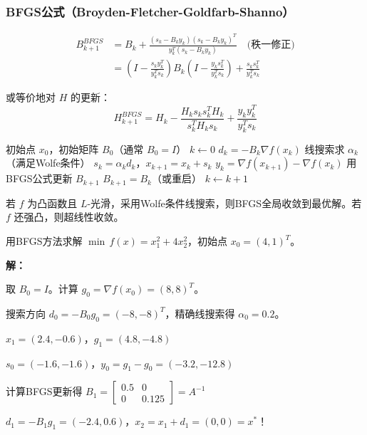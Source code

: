 \subsubsection{BFGS公式（Broyden-Fletcher-Goldfarb-Shanno）}

\begin{align}
B_{k+1}^{BFGS} &= B_k + \frac{(s_k - B_k y_k)(s_k - B_k y_k)^T}{y_k^T(s_k - B_k y_k)} \quad \text{(秩一修正)} \\
&= \left(I - \frac{s_k y_k^T}{y_k^T s_k}\right) B_k \left(I - \frac{y_k s_k^T}{y_k^T s_k}\right) + \frac{s_k s_k^T}{y_k^T s_k}
\end{align}

或等价地对 $H$ 的更新：
\[
H_{k+1}^{BFGS} = H_k - \frac{H_k s_k s_k^T H_k}{s_k^T H_k s_k} + \frac{y_k y_k^T}{y_k^T s_k}
\]

\begin{algorithm}[H]
\caption{BFGS方法}
\begin{algorithmic}[1]
\Require 初始点 $x_0$，初始矩阵 $B_0$（通常 $B_0 = I$）
\State $k \gets 0$
    \State $d_k = -B_k \nabla f(x_k)$
    \State 线搜索求 $\alpha_k$（满足Wolfe条件）
    \State $s_k = \alpha_k d_k$，$x_{k+1} = x_k + s_k$
    \State $y_k = \nabla f(x_{k+1}) - \nabla f(x_k)$
        \State 用BFGS公式更新 $B_{k+1}$
    \Else
        \State $B_{k+1} = B_k$（或重启）
    \EndIf
    \State $k \gets k + 1$
\EndWhile
\end{algorithmic}
\end{algorithm}

\begin{theorem}[BFGS的收敛性]
若 $f$ 为凸函数且 $L$-光滑，采用Wolfe条件线搜索，则BFGS全局收敛到最优解。若 $f$ 还强凸，则超线性收敛。
\end{theorem}

\begin{example}[BFGS求解]
用BFGS方法求解 $\min\, f(x) = x_1^2 + 4x_2^2$，初始点 $x_0 = (4, 1)^T$。

\textbf{解：}

取 $B_0 = I$。计算 $g_0 = \nabla f(x_0) = (8, 8)^T$。

搜索方向 $d_0 = -B_0 g_0 = (-8, -8)^T$，精确线搜索得 $\alpha_0 = 0.2$。

$x_1 = (2.4, -0.6)$，$g_1 = (4.8, -4.8)$

$s_0 = (-1.6, -1.6)$，$y_0 = g_1 - g_0 = (-3.2, -12.8)$

计算BFGS更新得 $B_1 = \begin{bmatrix} 0.5 & 0 \\ 0 & 0.125 \end{bmatrix} = A^{-1}$

$d_1 = -B_1 g_1 = (-2.4, 0.6)$，$x_2 = x_1 + d_1 = (0, 0) = x^*$！
\end{example}

